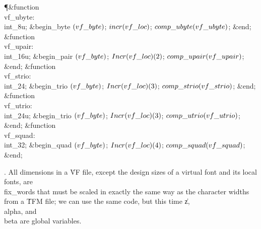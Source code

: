 \Y\P\4\&{function}\1\  \\{vf\_ubyte}: \\{int\_8u};\2\6
\&{begin\_byte} $(\\{vf\_byte})$;\5
$\\{incr}(\\{vf\_loc})$;\5
$\\{comp\_ubyte}(\\{vf\_ubyte})$;\6
\&{end};\7
\4\&{function}\1\  \\{vf\_upair}: \\{int\_16u};\2\6
\&{begin\_pair} $(\\{vf\_byte})$;\5
$\\{Incr}(\\{vf\_loc})(2)$;\5
$\\{comp\_upair}(\\{vf\_upair})$;\6
\&{end};\7
\4\&{function}\1\  \\{vf\_strio}: \\{int\_24};\2\6
\&{begin\_trio} $(\\{vf\_byte})$;\5
$\\{Incr}(\\{vf\_loc})(3)$;\5
$\\{comp\_strio}(\\{vf\_strio})$;\6
\&{end};\7
\4\&{function}\1\  \\{vf\_utrio}: \\{int\_24u};\2\6
\&{begin\_trio} $(\\{vf\_byte})$;\5
$\\{Incr}(\\{vf\_loc})(3)$;\5
$\\{comp\_utrio}(\\{vf\_utrio})$;\6
\&{end};\7
\4\&{function}\1\  \\{vf\_squad}: \\{int\_32};\2\6
\&{begin\_quad} $(\\{vf\_byte})$;\5
$\\{Incr}(\\{vf\_loc})(4)$;\5
$\\{comp\_squad}(\\{vf\_squad})$;\6
\&{end};\par
\fi

. All dimensions in a \.{VF} file, except the design sizes of a virtual
font and its local fonts, are \\{fix\_word}s that must be scaled in exactly
the same way as the character widths from a \.{TFM} file; we can use the
same code, but this time \|z, \\{alpha}, and \\{beta} are global variables.

